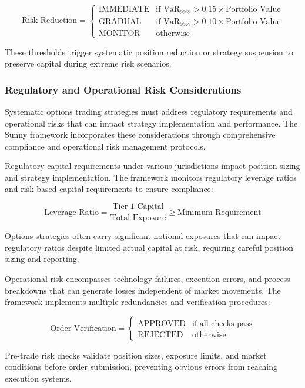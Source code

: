 \documentclass[
  american,
  11pt,
  11pt,
  letterpaper,
  onecolumn]{article}
\begin{document}
\[\text{Risk Reduction} = \begin{cases}
\text{IMMEDIATE} & \text{if VaR}_{99\%} > 0.15 \times \text{Portfolio Value} \\
\text{GRADUAL} & \text{if VaR}_{95\%} > 0.10 \times \text{Portfolio Value} \\
\text{MONITOR} & \text{otherwise}
\end{cases}\]

These thresholds trigger systematic position reduction or strategy
suspension to preserve capital during extreme risk scenarios.

\subsubsection{Regulatory and Operational Risk
Considerations}\label{regulatory-and-operational-risk-considerations}

Systematic options trading strategies must address regulatory
requirements and operational risks that can impact strategy
implementation and performance. The Sunny framework incorporates these
considerations through comprehensive compliance and operational risk
management protocols.

Regulatory capital requirements under various jurisdictions impact
position sizing and strategy implementation. The framework monitors
regulatory leverage ratios and risk-based capital requirements to ensure
compliance:

\[\text{Leverage Ratio} = \frac{\text{Tier 1 Capital}}{\text{Total Exposure}} \geq \text{Minimum Requirement}\]

Options strategies often carry significant notional exposures that can
impact regulatory ratios despite limited actual capital at risk,
requiring careful position sizing and reporting.

Operational risk encompasses technology failures, execution errors, and
process breakdowns that can generate losses independent of market
movements. The framework implements multiple redundancies and
verification procedures:

\[\text{Order Verification} = \begin{cases}
\text{APPROVED} & \text{if all checks pass} \\
\text{REJECTED} & \text{otherwise}
\end{cases}\]

Pre-trade risk checks validate position sizes, exposure limits, and
market conditions before order submission, preventing obvious errors
from reaching execution systems.
\end{document}
